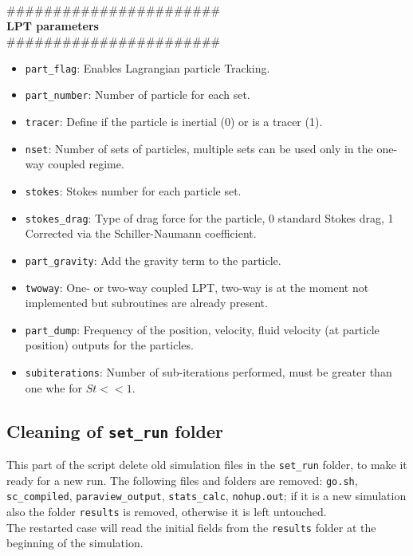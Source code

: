 \#\#\#\#\#\#\#\#\#\#\#\#\#\#\#\#\#\#\#\#\#\#\#\\
{\bf LPT parameters}\\
\#\#\#\#\#\#\#\#\#\#\#\#\#\#\#\#\#\#\#\#\#\#\#
\begin{itemize}[label={$\circ$}]
\item \texttt{part\_flag}: Enables Lagrangian particle Tracking.
\item \texttt{part\_number}:  Number of particle for each set.
\item \texttt{tracer}: Define if the particle is inertial (0) or is a tracer (1).
\item \texttt{nset}: Number of sets of particles, multiple sets can be used only in the one-way coupled regime.
\item \texttt{stokes}: Stokes number for each particle set.
\item \texttt{stokes\_drag}: Type of drag force for the particle, 0 standard Stokes drag, 1 Corrected via the Schiller-Naumann coefficient.
\item \texttt{part\_gravity}: Add the gravity term to the particle.
\item \texttt{twoway}: One- or two-way coupled LPT, two-way is at the moment not implemented but subroutines are already present. 
\item \texttt{part\_dump}: Frequency of the position, velocity, fluid velocity (at particle position) outputs for the particles.
\item \texttt{subiterations}: Number of sub-iterations performed, must be greater than one  whe for $St <<1$.
\end{itemize}

\subsection{Cleaning of \texttt{set\_run} folder}
\label{sec: restart}
This part of the script delete old simulation files in the \texttt{set\_run} folder, to make it ready for a new run. The following files and folders are removed: \texttt{go.sh}, \texttt{sc\_compiled}, \texttt{paraview\_output}, \texttt{stats\_calc}, \texttt{nohup.out}; if it is a new simulation also the folder \texttt{results} is removed, otherwise it is left untouched.\\
The restarted case will read the initial fields from the \texttt{results} folder at the beginning of the simulation.

